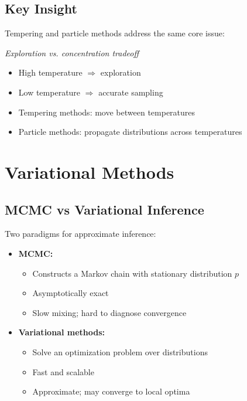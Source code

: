 \documentclass[12pt,oneside]{book}
\numberwithin{equation}{section}
\theoremstyle{definition}
\theoremstyle{plain}
\theoremstyle{remark}
\begin{document}
\subsection*{Key Insight}

Tempering and particle methods address the same core issue:

\begin{center}
\emph{Exploration vs. concentration tradeoff}
\end{center}

\begin{itemize}
    \item High temperature $\Rightarrow$ exploration
    \item Low temperature $\Rightarrow$ accurate sampling
\end{itemize}

\begin{itemize}
    \item Tempering methods: move between temperatures
    \item Particle methods: propagate distributions across temperatures
\end{itemize}

\section{Variational Methods}

\subsection{MCMC vs Variational Inference}

Two paradigms for approximate inference:

\begin{itemize}
    \item \textbf{MCMC:}
    \begin{itemize}
        \item Constructs a Markov chain with stationary distribution $p$
        \item Asymptotically exact
        \item Slow mixing; hard to diagnose convergence
    \end{itemize}
    
    \item \textbf{Variational methods:}
    \begin{itemize}
        \item Solve an optimization problem over distributions
        \item Fast and scalable
        \item Approximate; may converge to local optima
    \end{itemize}
\end{itemize}
\end{document}
